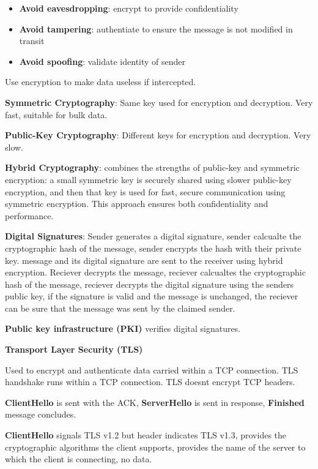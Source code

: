 \documentclass{article}
\begin{document}
\begin{itemize}
    \item \textbf{Avoid eavesdropping}: encrypt to provide confidentiality
    \item \textbf{Avoid tampering}: authentiate to ensure the message is not modified in transit
    \item \textbf{Avoid spoofing}: validate identity of sender
\end{itemize}

Use encryption to make data useless if intercepted.

\textbf{Symmetric Cryptography}: Same key used for encryption and decryption. Very fast, suitable for bulk data.

\textbf{Public-Key Cryptography}: Different keys for encryption and decryption. Very slow.

\textbf{Hybrid Cryptography}: combines the strengths of public-key and symmetric encryption:
a small symmetric key is securely shared using slower public-key encryption,
and then that key is used for fast, secure communication using symmetric encryption.
This approach ensures both confidentiality and performance.

\textbf{Digital Signatures}: Sender generates a digital signature,
sender calcualte the cryptographic hash of the message,
sender encrypts the hash with their private key.
message and its digital signature are sent to the receiver using hybrid encryption.
Reciever decrypts the message,
reciever calcualtes the cryptographic hash of the message,
reciever decrypts the digital signature using the senders public key,
if the signature is valid and the message is unchanged, the reciever can be sure that the message was sent by the claimed sender.

\textbf{Public key infrastructure (PKI)} verifies digital signatures.

\vspace{\baselineskip}
\textbf{Transport Layer Security (TLS)}

Used to encrypt and authenticate data carried within a TCP connection.
TLS handshake runs within a TCP connection.
TLS doesnt encrypt TCP headers.

\textbf{ClientHello} is sent with the ACK, \textbf{ServerHello} is sent in response, \textbf{Finished} message concludes.

\textbf{ClientHello} signals TLS v1.2 but header indicates TLS v1.3, provides the cryptographic algorithms the client supports, provides the name of the server to which the client is connecting, no data.
\end{document}
